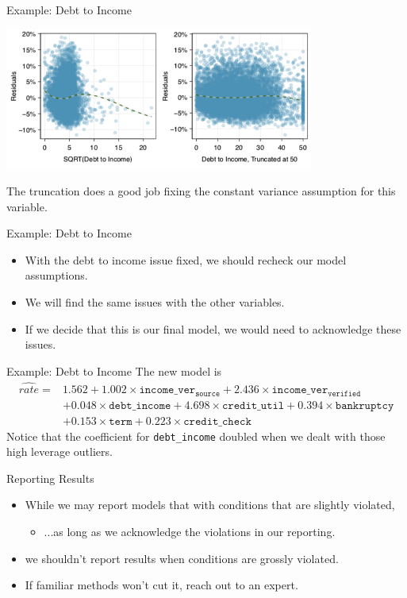 \begin{frame}{Example: Debt to Income}
    \begin{center}
        \includegraphics[width=4in]{images/newresids.png}
    \end{center}
    The truncation does a good job fixing the constant variance assumption for this variable.
\end{frame}

\begin{frame}{Example: Debt to Income}
    \begin{itemize}
        \item With the debt to income issue fixed, we should recheck our model assumptions.
        \item We will find the same issues with the other variables.
        \item If we decide that this is our final model, we would need to acknowledge these issues.
    \end{itemize}
\end{frame}

\begin{frame}{Example: Debt to Income}
    The new model is
    \small{
    \begin{align*}
        \hat{rate} =& 1.562 + 1.002\times\texttt{income\_ver}_{\texttt{source}} + 2.436\times\texttt{income\_ver}_{\texttt{verified}} \\
        &+ 0.048\times\texttt{debt\_income} + 4.698\times\texttt{credit\_util} + 0.394\times\texttt{bankruptcy} \\
        &+ 0.153\times\texttt{term} + 0.223\times\texttt{credit\_check}
    \end{align*}
    }
    Notice that the coefficient for \texttt{debt\_income} doubled when we dealt with those high leverage outliers. 
\end{frame}

\begin{frame}{Reporting Results}
    \begin{itemize}
        \item While we may report models that with conditions that are slightly violated,
        \begin{itemize}
            \item ...as long as we acknowledge the violations in our reporting.
        \end{itemize}
        \item we shouldn't report results when conditions are grossly violated.
        \item If familiar methods won't cut it, reach out to an expert.
    \end{itemize}
\end{frame}

